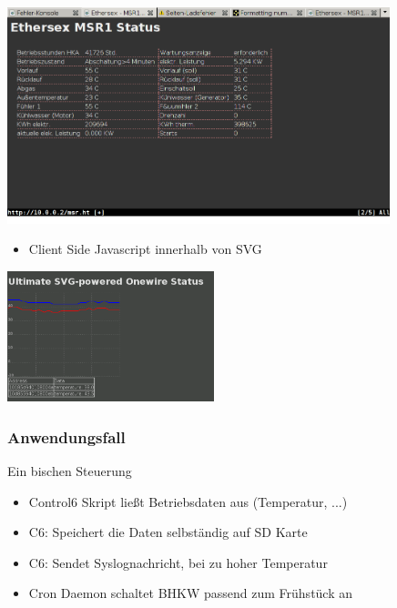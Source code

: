 \documentclass[utf8, xcolor=dvipsnames]{beamer}
\begin{document}
\begin{frame}
  \begin{center}
    \includegraphics[width=11.1cm]{Msr1_screenshot.png}
  \end{center}
\end{frame}

\begin{frame}
  
  \begin{itemize}
  \item Client Side Javascript innerhalb von SVG
  \end{itemize}

    \includegraphics[width=6cm]{Onewire-svg.png}

\end{frame}


\begin{frame}
  \frametitle{Anwendungsfall}
  
  \begin{block}{Ein bischen Steuerung}
    \begin{itemize}
    \item Control6 Skript ließt Betriebsdaten aus (Temperatur, ...)
    \item C6: Speichert die Daten selbständig auf SD Karte
    \item C6: Sendet Syslognachricht, bei zu hoher Temperatur
    \item Cron Daemon schaltet BHKW passend zum Frühstück an
    \end{itemize}
  \end{block}

\end{frame}
\end{document}
